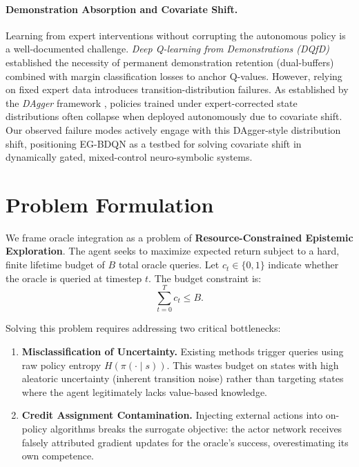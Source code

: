 \documentclass[11pt, a4paper]{article}
\begin{document}
\paragraph{Demonstration Absorption and Covariate Shift.}
Learning from expert interventions without corrupting the autonomous policy is a well-documented challenge. \textit{Deep Q-learning from Demonstrations (DQfD)} \citep{hester2018deep} established the necessity of permanent demonstration retention (dual-buffers) combined with margin classification losses to anchor Q-values. However, relying on fixed expert data introduces transition-distribution failures. As established by the \textit{DAgger} framework \citep{ross2011reduction}, policies trained under expert-corrected state distributions often collapse when deployed autonomously due to covariate shift. Our observed failure modes actively engage with this DAgger-style distribution shift, positioning EG-BDQN as a testbed for solving covariate shift in dynamically gated, mixed-control neuro-symbolic systems.


\section{Problem Formulation}

We frame oracle integration as a problem of \textbf{Resource-Constrained Epistemic Exploration}. The agent seeks to maximize expected return subject to a hard, finite lifetime budget of $B$ total oracle queries. Let $c_t \in \{0,1\}$ indicate whether the oracle is queried at timestep $t$. The budget constraint is:
\begin{equation}
    \sum_{t=0}^{T} c_t \leq B.
    \label{eq:budget}
\end{equation}

Solving this problem requires addressing two critical bottlenecks:
\begin{enumerate}[leftmargin=*, label=(\roman*)]
    \item \textbf{Misclassification of Uncertainty.} Existing methods trigger queries using raw policy entropy $H(\pi(\cdot \mid s))$. This wastes budget on states with high aleatoric uncertainty (inherent transition noise) rather than targeting states where the agent legitimately lacks value-based knowledge.
    \item \textbf{Credit Assignment Contamination.} Injecting external actions into on-policy algorithms breaks the surrogate objective: the actor network receives falsely attributed gradient updates for the oracle's success, overestimating its own competence.
\end{enumerate}
\end{document}
